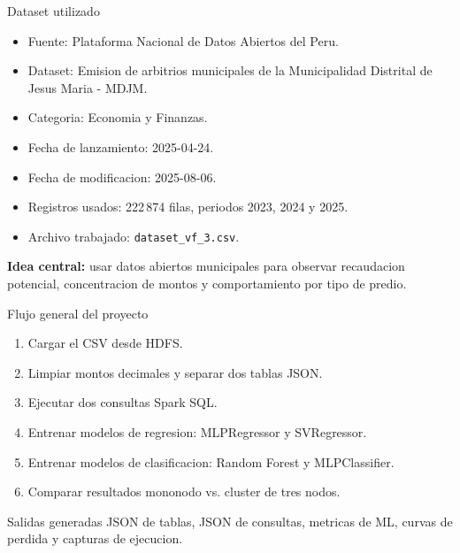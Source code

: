 \documentclass[aspectratio=169,11pt]{beamer}
\begin{document}
\begin{frame}{Dataset utilizado}
    \begin{itemize}
        \item Fuente: Plataforma Nacional de Datos Abiertos del Peru.
        \item Dataset: Emision de arbitrios municipales de la Municipalidad Distrital de Jesus Maria - MDJM.
        \item Categoria: Economia y Finanzas.
        \item Fecha de lanzamiento: 2025-04-24.
        \item Fecha de modificacion: 2025-08-06.
        \item Registros usados: 222\,874 filas, periodos 2023, 2024 y 2025.
        \item Archivo trabajado: \texttt{dataset\_vf\_3.csv}.
    \end{itemize}

    \vspace{0.15cm}
    \small
    \textbf{Idea central:} usar datos abiertos municipales para observar recaudacion potencial, concentracion de montos y comportamiento por tipo de predio.
\end{frame}

\begin{frame}{Flujo general del proyecto}
    \begin{enumerate}
        \item Cargar el CSV desde HDFS.
        \item Limpiar montos decimales y separar dos tablas JSON.
        \item Ejecutar dos consultas Spark SQL.
        \item Entrenar modelos de regresion: MLPRegressor y SVRegressor.
        \item Entrenar modelos de clasificacion: Random Forest y MLPClassifier.
        \item Comparar resultados mononodo vs. cluster de tres nodos.
    \end{enumerate}

    \begin{block}{Salidas generadas}
        JSON de tablas, JSON de consultas, metricas de ML, curvas de perdida y capturas de ejecucion.
    \end{block}
\end{frame}
\end{document}
